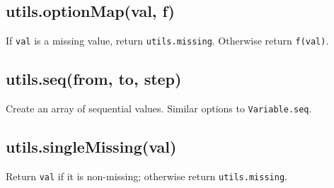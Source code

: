 \documentclass{article}
\begin{document}
    \subsection{utils.optionMap(val, f)}
    If \texttt{val} is a missing value, return \texttt{utils.missing}. Otherwise return \texttt{f(val)}.


    \subsection{utils.seq(from, to, step)}
    Create an array of sequential values. Similar options to \texttt{Variable.seq}.


    \subsection{utils.singleMissing(val)}
    Return \texttt{val} if it is non-missing; otherwise return \texttt{utils.missing}.
\end{document}
